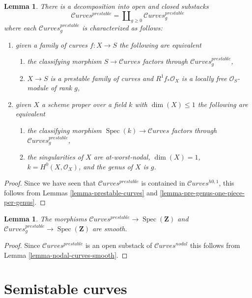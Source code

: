 \documentclass{stacks-project}
\theoremstyle{plain}
\newtheorem{lemma}[subsection]{Lemma}
\theoremstyle{definition}
\theoremstyle{remark}
\numberwithin{equation}{subsection}
\def\Spec{\mathop{\mathrm{Spec}}}
\def\Curvesstack{\mathcal{C}\!\mathit{urves}}
\begin{document}
\begin{lemma}
\label{lemma-prestable-one-piece-per-genus}
There is a decomposition into open and closed substacks
$$
\Curvesstack^{prestable} = \coprod\nolimits_{g \geq 0}
\Curvesstack^{prestable}_g
$$
where each $\Curvesstack^{prestable}_g$ is characterized as follows:
\begin{enumerate}
\item given a family of curves $f : X \to S$ the following are equivalent
\begin{enumerate}
\item the classifying morphism $S \to \Curvesstack$ factors
through $\Curvesstack^{prestable}_g$,
\item $X \to S$ is a prestable family of curves and
$R^1f_*\mathcal{O}_X$ is a locally free $\mathcal{O}_S$-module of rank $g$,
\end{enumerate}
\item given $X$ a scheme proper over a field $k$ with
$\dim(X) \leq 1$ the following are equivalent
\begin{enumerate}
\item the classifying morphism $\Spec(k) \to \Curvesstack$
factors through $\Curvesstack^{prestable}_g$,
\item the singularities of $X$ are at-worst-nodal, $\dim(X) = 1$,
$k = H^0(X, \mathcal{O}_X)$, and the genus of $X$ is $g$.
\end{enumerate}
\end{enumerate}
\end{lemma}

\begin{proof}
Since we have seen that $\Curvesstack^{prestable}$ is contained
in $\Curvesstack^{h0, 1}$, this
follows from Lemmas \ref{lemma-prestable-curves} and
\ref{lemma-pre-genus-one-piece-per-genus}.
\end{proof}

\begin{lemma}
\label{lemma-prestable-curves-smooth}
The morphisms
$\Curvesstack^{prestable} \to \Spec(\mathbf{Z})$ and
$\Curvesstack^{prestable}_g \to \Spec(\mathbf{Z})$ are
smooth.
\end{lemma}

\begin{proof}
Since $\Curvesstack^{prestable}$ is an open substack of
$\Curvesstack^{nodal}$ this follows from
Lemma \ref{lemma-nodal-curves-smooth}.
\end{proof}




\section{Semistable curves}
\label{section-semistable-curves}
\end{document}
